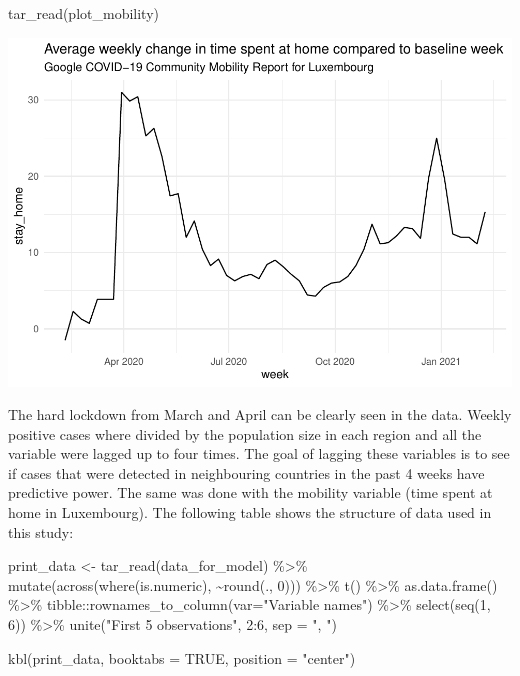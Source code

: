 \documentclass{article}
\newenvironment{Shaded}{\begin{snugshade}}{\end{snugshade}}
\newcommand{\AttributeTok}[1]{\textcolor[rgb]{0.77,0.63,0.00}{#1}}
\newcommand{\ConstantTok}[1]{\textcolor[rgb]{0.00,0.00,0.00}{#1}}
\newcommand{\DecValTok}[1]{\textcolor[rgb]{0.00,0.00,0.81}{#1}}
\newcommand{\FunctionTok}[1]{\textcolor[rgb]{0.00,0.00,0.00}{#1}}
\newcommand{\NormalTok}[1]{#1}
\newcommand{\OtherTok}[1]{\textcolor[rgb]{0.56,0.35,0.01}{#1}}
\newcommand{\SpecialCharTok}[1]{\textcolor[rgb]{0.00,0.00,0.00}{#1}}
\newcommand{\StringTok}[1]{\textcolor[rgb]{0.31,0.60,0.02}{#1}}
\begin{document}
\begin{Shaded}
\begin{Highlighting}[]
\FunctionTok{tar\_read}\NormalTok{(plot\_mobility)}
\end{Highlighting}
\end{Shaded}

\includegraphics{paper_files/figure-latex/unnamed-chunk-4-1.pdf}

The hard lockdown from March and April can be clearly seen in the data.
Weekly positive cases where divided by the population size in each
region and all the variable were lagged up to four times. The goal of
lagging these variables is to see if cases that were detected in
neighbouring countries in the past 4 weeks have predictive power. The
same was done with the mobility variable (time spent at home in
Luxembourg). The following table shows the structure of data used in
this study:

\begin{Shaded}
\begin{Highlighting}[]
\NormalTok{print\_data }\OtherTok{\textless{}{-}} \FunctionTok{tar\_read}\NormalTok{(data\_for\_model) }\SpecialCharTok{\%\textgreater{}\%}
  \FunctionTok{mutate}\NormalTok{(}\FunctionTok{across}\NormalTok{(}\FunctionTok{where}\NormalTok{(is.numeric), }\SpecialCharTok{\textasciitilde{}}\FunctionTok{round}\NormalTok{(., }\DecValTok{0}\NormalTok{))) }\SpecialCharTok{\%\textgreater{}\%}
  \FunctionTok{t}\NormalTok{() }\SpecialCharTok{\%\textgreater{}\%}
  \FunctionTok{as.data.frame}\NormalTok{() }\SpecialCharTok{\%\textgreater{}\%}
\NormalTok{  tibble}\SpecialCharTok{::}\FunctionTok{rownames\_to\_column}\NormalTok{(}\AttributeTok{var=}\StringTok{"Variable names"}\NormalTok{) }\SpecialCharTok{\%\textgreater{}\%}
  \FunctionTok{select}\NormalTok{(}\FunctionTok{seq}\NormalTok{(}\DecValTok{1}\NormalTok{, }\DecValTok{6}\NormalTok{)) }\SpecialCharTok{\%\textgreater{}\%}
  \FunctionTok{unite}\NormalTok{(}\StringTok{"First 5 observations"}\NormalTok{, }\DecValTok{2}\SpecialCharTok{:}\DecValTok{6}\NormalTok{, }\AttributeTok{sep =} \StringTok{", "}\NormalTok{) }

\FunctionTok{kbl}\NormalTok{(print\_data, }\AttributeTok{booktabs =} \ConstantTok{TRUE}\NormalTok{, }\AttributeTok{position =} \StringTok{"center"}\NormalTok{)}
\end{Highlighting}
\end{Shaded}
\end{document}
